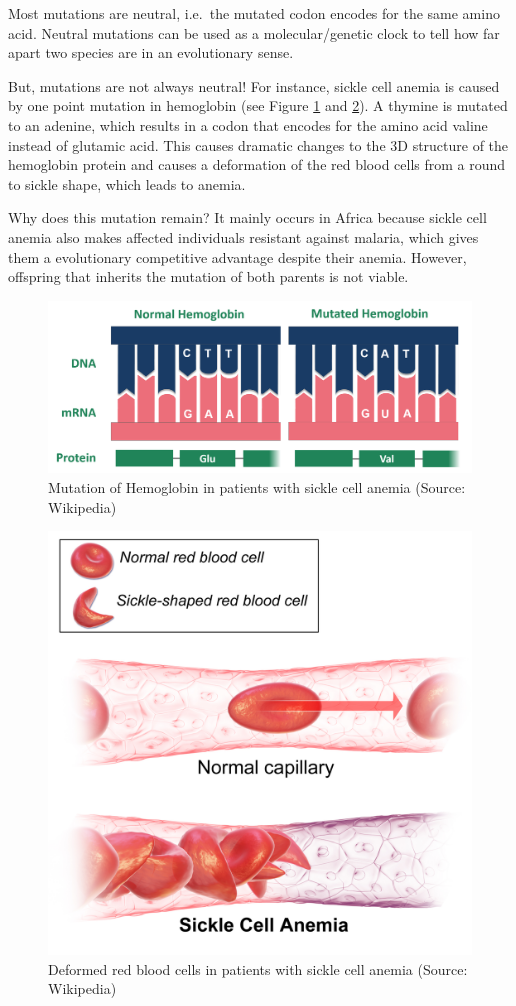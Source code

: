 \documentclass[
  11pt,
]{book}
\begin{document}
Most mutations are neutral, i.e.~the mutated codon encodes for the same amino acid. Neutral mutations can be used as a molecular/genetic clock to tell how far apart two species are in an evolutionary sense.

But, mutations are not always neutral! For instance, sickle cell anemia is caused by one point mutation in hemoglobin (see Figure \ref{fig:sickleCell1} and \ref{fig:sickleCell2}). A thymine is mutated to an adenine, which results in a codon that encodes for the amino acid valine instead of glutamic acid. This causes dramatic changes to the 3D structure of the hemoglobin protein and causes a deformation of the red blood cells from a round to sickle shape, which leads to anemia.

Why does this mutation remain? It mainly occurs in Africa because sickle cell anemia also makes affected individuals resistant against malaria, which gives them a evolutionary competitive advantage despite their anemia. However, offspring that inherits the mutation of both parents is not viable.

\begin{figure}

{\centering \includegraphics[width=0.45\linewidth]{./figs/sickleCellWikipedia2} 

}

\caption{Mutation of Hemoglobin in patients with sickle cell anemia (Source: Wikipedia)}\label{fig:sickleCell1}
\end{figure}

\begin{figure}

{\centering \includegraphics[width=0.45\linewidth]{./figs/Sickle_Cell_Anemia_wiki3} 

}

\caption{Deformed red blood cells in patients with sickle cell anemia (Source: Wikipedia)}\label{fig:sickleCell2}
\end{figure}
\end{document}
